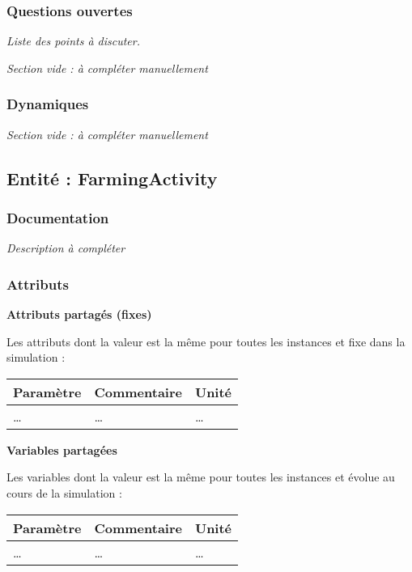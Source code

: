 \documentclass[
]{article}
\begin{document}
\subsubsection{Questions ouvertes}\label{questions-ouvertes-2}

\emph{Liste des points à discuter.}

\emph{Section vide : à compléter manuellement}

\subsubsection{Dynamiques}\label{dynamiques-2}

\emph{Section vide : à compléter manuellement}

\subsection{Entité : FarmingActivity}\label{entituxe9-farmingactivity}

\subsubsection{Documentation}\label{documentation-4}

\emph{Description à compléter}

\subsubsection{Attributs}\label{attributs-4}

\textbf{Attributs partagés (fixes)}

Les attributs dont la valeur est la même pour toutes les instances et
fixe dans la simulation :

\begin{longtable}[]{@{}lll@{}}
\toprule\noalign{}
\textbf{Paramètre} & \textbf{Commentaire} & \textbf{Unité} \\
\midrule\noalign{}
\endhead
\bottomrule\noalign{}
\endlastfoot
\ldots{} & \ldots{} & \ldots{} \\
\end{longtable}

\textbf{Variables partagées}

Les variables dont la valeur est la même pour toutes les instances et
évolue au cours de la simulation :

\begin{longtable}[]{@{}lll@{}}
\toprule\noalign{}
\textbf{Paramètre} & \textbf{Commentaire} & \textbf{Unité} \\
\midrule\noalign{}
\endhead
\bottomrule\noalign{}
\endlastfoot
\ldots{} & \ldots{} & \ldots{} \\
\end{longtable}
\end{document}
